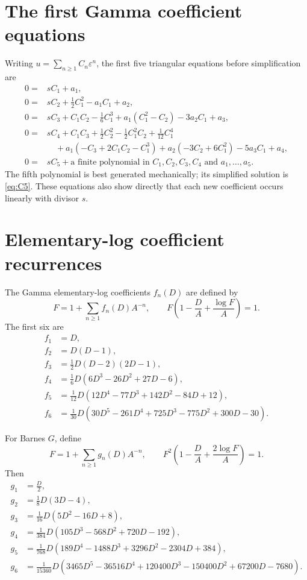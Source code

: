 \documentclass[11pt]{article}
\theoremstyle{definition}
\theoremstyle{remark}
\begin{document}
\section{The first Gamma coefficient equations}\label{app:gamma-equations}

Writing \(u=\sum_{n\ge1}C_n\varepsilon^n\), the first five triangular equations before simplification are
\begin{align*}
0={}&sC_1+a_1,\\
0={}&sC_2+\frac12C_1^2-a_1C_1+a_2,\\
0={}&sC_3+C_1C_2-\frac16C_1^3
 +a_1(C_1^2-C_2)-3a_2C_1+a_3,\\
0={}&sC_4+C_1C_3+\frac12C_2^2-\frac12C_1^2C_2
 +\frac1{12}C_1^4\\
&\quad+a_1(-C_3+2C_1C_2-C_1^3)
 +a_2(-3C_2+6C_1^2)-5a_3C_1+a_4,\\
0={}&sC_5+\text{a finite polynomial in }C_1,C_2,C_3,C_4
 \text{ and }a_1,\ldots,a_5.
\end{align*}
The fifth polynomial is best generated mechanically; its simplified solution is \cref{eq:C5}.  These equations also show directly that each new coefficient occurs linearly with divisor \(s\).

\section{Elementary-log coefficient recurrences}\label{app:log-recurrences}

The Gamma elementary-log coefficients \(f_n(D)\) are defined by
\[
 F=1+\sum_{n\ge1}f_n(D)A^{-n},
 \qquad
 F\left(1-\frac{D}{A}+\frac{\log F}{A}\right)=1.
\]
The first six are
\begin{align*}
 f_1&=D,\\
 f_2&=D(D-1),\\
 f_3&=\frac12D(D-2)(2D-1),\\
 f_4&=\frac16D(6D^3-26D^2+27D-6),\\
 f_5&=\frac1{12}D(12D^4-77D^3+142D^2-84D+12),\\
 f_6&=\frac1{30}D(30D^5-261D^4+725D^3-775D^2+300D-30).
\end{align*}

For Barnes \(G\), define
\[
 F=1+\sum_{n\ge1}g_n(D)A^{-n},
 \qquad
 F^2\left(1-\frac{D}{A}+\frac{2\log F}{A}\right)=1.
\]
Then
\begin{align*}
 g_1&=\frac D2,\\
 g_2&=\frac18D(3D-4),\\
 g_3&=\frac1{16}D(5D^2-16D+8),\\
 g_4&=\frac1{384}D(105D^3-568D^2+720D-192),\\
 g_5&=\frac1{768}D(189D^4-1488D^3+3296D^2-2304D+384),\\
 g_6&=\frac1{15360}D(3465D^5-36516D^4+120400D^3
 -150400D^2+67200D-7680).
\end{align*}
\end{document}
